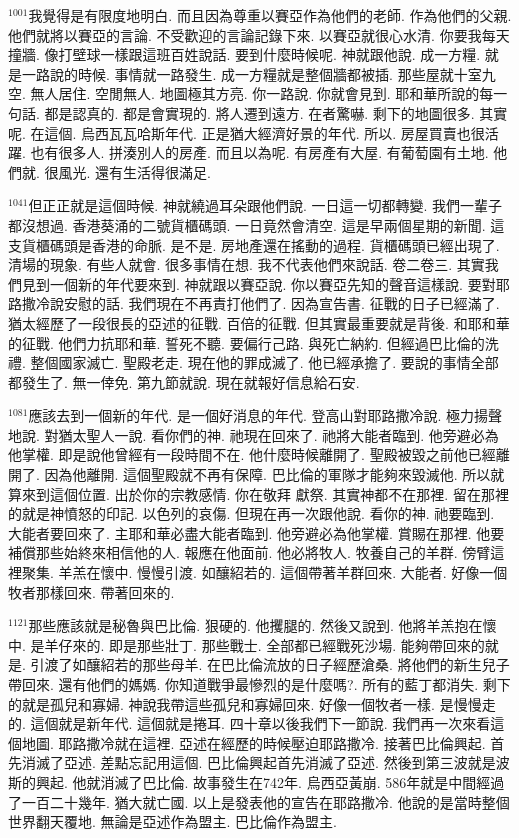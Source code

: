 \documentclass{book}
\begin{document}
$^{1001}$我覺得是有限度地明白.
而且因為尊重以賽亞作為他們的老師.
作為他們的父親.
他們就將以賽亞的言論.
不受歡迎的言論記錄下來.
以賽亞就很心水清.
你要我每天撞牆.
像打壁球一樣跟這班百姓說話.
要到什麼時候呢.
神就跟他說.
成一方糧.
就是一路說的時候.
事情就一路發生.
成一方糧就是整個牆都被插.
那些屋就十室九空.
無人居住.
空閒無人.
地圖極其方亮.
你一路說.
你就會見到.
耶和華所說的每一句話.
都是認真的.
都是會實現的.
將人遷到遠方.
在者驚嚇.
剩下的地圖很多.
其實呢.
在這個.
烏西瓦瓦哈斯年代.
正是猶大經濟好景的年代.
所以.
房屋買賣也很活躍.
也有很多人.
拼湊別人的房產.
而且以為呢.
有房產有大屋.
有葡萄園有土地.
他們就.
很風光.
還有生活得很滿足.

$^{1041}$但正正就是這個時候.
神就繞過耳朵跟他們說.
一日這一切都轉變.
我們一輩子都沒想過.
香港葵涌的二號貨櫃碼頭.
一日竟然會清空.
這是早兩個星期的新聞.
這支貨櫃碼頭是香港的命脈.
是不是.
房地產還在搖動的過程.
貨櫃碼頭已經出現了.
清場的現象.
有些人就會.
很多事情在想.
我不代表他們來說話.
卷二卷三.
其實我們見到一個新的年代要來到.
神就跟以賽亞說.
你以賽亞先知的聲音這樣說.
要對耶路撒冷說安慰的話.
我們現在不再責打他們了.
因為宣告書.
征戰的日子已經滿了.
猶太經歷了一段很長的亞述的征戰.
百倍的征戰.
但其實最重要就是背後.
和耶和華的征戰.
他們力抗耶和華.
誓死不聽.
要偏行己路.
與死亡納約.
但經過巴比倫的洗禮.
整個國家滅亡.
聖殿老走.
現在他的罪成滅了.
他已經承擔了.
要說的事情全部都發生了.
無一倖免.
第九節就說.
現在就報好信息給石安.

$^{1081}$應該去到一個新的年代.
是一個好消息的年代.
登高山對耶路撒冷說.
極力揚聲地說.
對猶太聖人一說.
看你們的神.
祂現在回來了.
祂將大能者臨到.
他旁避必為他掌權.
即是說他曾經有一段時間不在.
他什麼時候離開了.
聖殿被毀之前他已經離開了.
因為他離開.
這個聖殿就不再有保障.
巴比倫的軍隊才能夠來毀滅他.
所以就算來到這個位置.
出於你的宗教感情.
你在敬拜 獻祭.
其實神都不在那裡.
留在那裡的就是神憤怒的印記.
以色列的哀傷.
但現在再一次跟他說.
看你的神.
祂要臨到.
大能者要回來了.
主耶和華必盡大能者臨到.
他旁避必為他掌權.
賞賜在那裡.
他要補償那些始終來相信他的人.
報應在他面前.
他必將牧人.
牧養自己的羊群.
傍臂這裡聚集.
羊羔在懷中.
慢慢引渡.
如釀紹若的.
這個帶著羊群回來.
大能者.
好像一個牧者那樣回來.
帶著回來的.

$^{1121}$那些應該就是秘魯與巴比倫.
狠硬的.
他攫腿的.
然後又說到.
他將羊羔抱在懷中.
是羊仔來的.
即是那些壯丁.
那些戰士.
全部都已經戰死沙場.
能夠帶回來的就是.
引渡了如釀紹若的那些母羊.
在巴比倫流放的日子經歷滄桑.
將他們的新生兒子帶回來.
還有他們的媽媽.
你知道戰爭最慘烈的是什麼嗎?.
所有的藍丁都消失.
剩下的就是孤兒和寡婦.
神說我帶這些孤兒和寡婦回來.
好像一個牧者一樣.
是慢慢走的.
這個就是新年代.
這個就是捲耳.
四十章以後我們下一節說.
我們再一次來看這個地圖.
耶路撒冷就在這裡.
亞述在經歷的時候壓迫耶路撒冷.
接著巴比倫興起.
首先消滅了亞述.
差點忘記用這個.
巴比倫興起首先消滅了亞述.
然後到第三波就是波斯的興起.
他就消滅了巴比倫.
故事發生在742年.
烏西亞黃崩.
586年就是中間經過了一百二十幾年.
猶大就亡國.
以上是發表他的宣告在耶路撒冷.
他說的是當時整個世界翻天覆地.
無論是亞述作為盟主.
巴比倫作為盟主.
\end{document}
